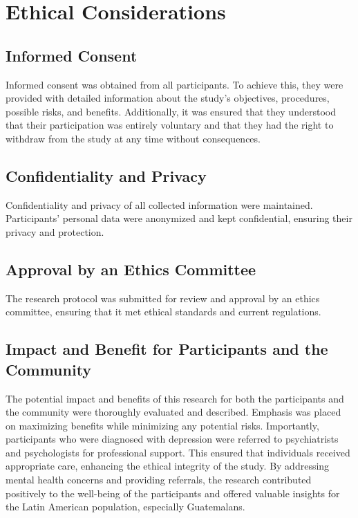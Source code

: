 \documentclass[jou]{apa7}
\begin{document}
\section{Ethical Considerations}\label{consideraciones-uxe9ticas}

\subsection{Informed Consent}\label{consentimiento-informado}

Informed consent was obtained from all participants. To achieve this, they were provided with detailed information about the study's objectives, procedures, possible risks, and benefits. Additionally, it was ensured that they understood that their participation was entirely voluntary and that they had the right to withdraw from the study at any time without consequences.

\subsection{Confidentiality and Privacy}\label{confidencialidad-y-privacidad}

Confidentiality and privacy of all collected information were maintained. Participants' personal data were anonymized and kept confidential, ensuring their privacy and protection.

\subsection{Approval by an Ethics Committee}\label{aprobaciuxf3n-de-un-comituxe9-de-uxe9tica}

The research protocol was submitted for review and approval by an ethics committee, ensuring that it met ethical standards and current regulations.

\subsection{Impact and Benefit for Participants and the Community}\label{impact-and-benefit-for-participants-and-community}

The potential impact and benefits of this research for both the participants and the community were thoroughly evaluated and described. Emphasis was placed on maximizing benefits while minimizing any potential risks. Importantly, participants who were diagnosed with depression were referred to psychiatrists and psychologists for professional support. This ensured that individuals received appropriate care, enhancing the ethical integrity of the study. By addressing mental health concerns and providing referrals, the research contributed positively to the well-being of the participants and offered valuable insights for the Latin American population, especially Guatemalans.
\end{document}
